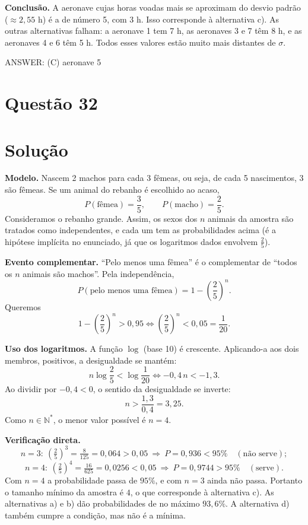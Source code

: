 \documentclass{article}%
\begin{document}
\textbf{Conclusão.} A aeronave cujas horas voadas mais se aproximam do desvio padrão ($\approx 2{,}55$ h) é a de número 5, com 3 h. Isso corresponde à alternativa c). As outras alternativas falham: a aeronave 1 tem 7 h, as aeronaves 3 e 7 têm 8 h, e as aeronaves 4 e 6 têm 5 h. Todos esses valores estão muito mais distantes de $\sigma$.

ANSWER: (C) aeronave 5%
\newpage%
\section*{Questão 32}

\section*{Solução}

\textbf{Modelo.} Nascem 2 machos para cada 3 fêmeas, ou seja, de cada 5 nascimentos, 3 são fêmeas. Se um animal do rebanho é escolhido ao acaso,
\[
P(\text{fêmea})=\frac{3}{5},\qquad P(\text{macho})=\frac{2}{5}.
\]
Consideramos o rebanho grande. Assim, os sexos dos $n$ animais da amostra são tratados como independentes, e cada um tem as probabilidades acima (é a hipótese implícita no enunciado, já que os logaritmos dados envolvem $\tfrac{2}{5}$).

\textbf{Evento complementar.} ``Pelo menos uma fêmea'' é o complementar de ``todos os $n$ animais são machos''. Pela independência,
\[
P(\text{pelo menos uma fêmea}) = 1-\left(\frac{2}{5}\right)^{n}.
\]
Queremos
\[
1-\left(\frac{2}{5}\right)^{n} > 0{,}95 \iff \left(\frac{2}{5}\right)^{n} < 0{,}05=\frac{1}{20}.
\]

\textbf{Uso dos logaritmos.} A função $\log$ (base 10) é crescente. Aplicando-a aos dois membros, positivos, a desigualdade se mantém:
\[
n\log\frac{2}{5} < \log\frac{1}{20} \iff -0{,}4\,n < -1{,}3 .
\]
Ao dividir por $-0{,}4<0$, o sentido da desigualdade se inverte:
\[
n > \frac{1{,}3}{0{,}4} = 3{,}25 .
\]
Como $n\in\mathbb{N}^*$, o menor valor possível é $n=4$.

\textbf{Verificação direta.}
\[
n=3:\ \left(\tfrac{2}{5}\right)^{3}=\tfrac{8}{125}=0{,}064>0{,}05 \ \Rightarrow\ P=0{,}936<95\% \quad(\text{não serve});
\]
\[
n=4:\ \left(\tfrac{2}{5}\right)^{4}=\tfrac{16}{625}=0{,}0256<0{,}05 \ \Rightarrow\ P=0{,}9744>95\% \quad(\text{serve}).
\]
Com $n=4$ a probabilidade passa de $95\%$, e com $n=3$ ainda não passa. Portanto o tamanho mínimo da amostra é $4$, o que corresponde à alternativa c). As alternativas a) e b) dão probabilidades de no máximo $93{,}6\%$. A alternativa d) também cumpre a condição, mas não é a mínima.
\end{document}
